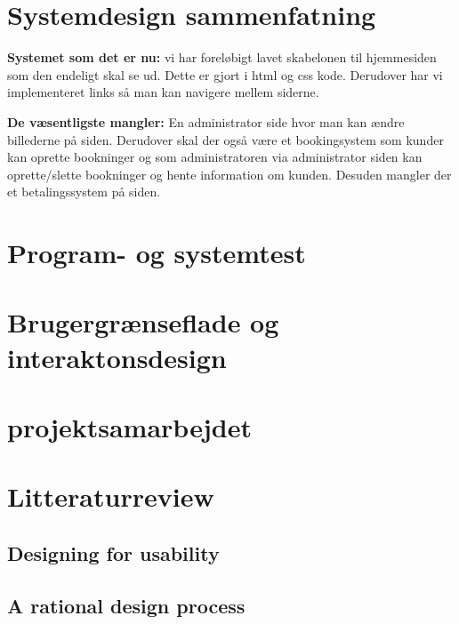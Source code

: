 \documentclass[12pt,a4paper]{article}
\begin{document}
\section{Systemdesign sammenfatning}
\textbf{Systemet som det er nu:}
vi har foreløbigt lavet skabelonen til hjemmesiden som den endeligt skal se ud. Dette er gjort i html og css kode. Derudover har vi implementeret links så man kan navigere mellem siderne. 

\textbf{De væsentligste mangler:}
En administrator side hvor man kan ændre billederne på siden. 
Derudover skal der også være et bookingsystem som kunder kan oprette bookninger og som administratoren via administrator siden kan oprette/slette bookninger og hente information om kunden. Desuden mangler der et betalingssystem på siden.
\newpage
\section{Program- og systemtest}
\newpage
\section{Brugergrænseflade og interaktonsdesign}
\newpage
\section{projektsamarbejdet}
\newpage
\section{Litteraturreview}
\subsection{Designing for usability}
\subsection{A rational design process}
\end{document}
